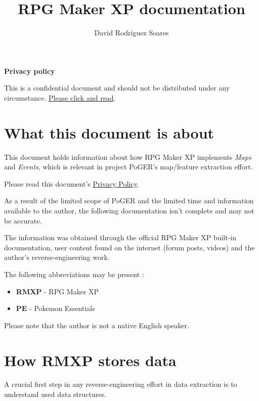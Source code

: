 \documentclass[11pt]{article}
\title{RPG Maker XP documentation}
\author{David Rodriguez Soares}
\begin{document}
\maketitle

\vspace*{\fill}

\textbf{Privacy policy}

This is a confidential document and should not be distributed under any circumstance. \hyperref[sec:privacypolice]{Please click and read}.

\vspace{20mm}

\newpage

\begingroup
\hypersetup{linkcolor=black}
\tableofcontents
\endgroup

\newpage
\section{What this document is about}

This document holds information about how RPG Maker XP implements \textit{Maps} and \textit{Events}, which is relevant in project PoGER's map/feature extraction effort.

Please read this document's \hyperref[sec:privacypolice]{Privacy Policy}.

As a result of the limited scope of PoGER and the limited time and information available to the author, the following documentation isn't complete and may not be accurate.

The information was obtained through the official RPG Maker XP built-in documentation, user content found on the internet (forum posts, videos) and the author's reverse-engineering work.

The following abbreviations may be present :
\begin{itemize}
	\item \textbf{RMXP} - RPG Maker XP
	\item \textbf{PE} - Pokemon Essentials
\end{itemize}

Please note that the author is not a native English speaker.


\newpage
\section{How RMXP stores data}

A crucial first step in any reverse-engineering effort in data extraction is to understand used data structures.
\end{document}
